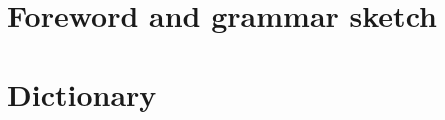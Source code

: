 \documentclass[output=book,modfonts,nonflat 
		  ]{langsci/langscibook}
\begin{document}
     

 

\maketitle                
\frontmatter

\tableofcontents
 
 
  
  

\mainmatter         

 
\part{Foreword and grammar sketch}

 
\part{Dictionary}
 


%  
 
\end{document}
